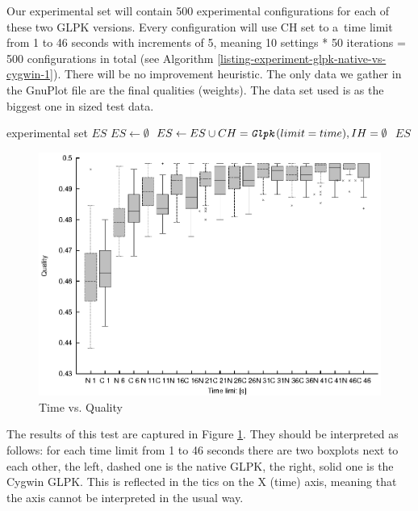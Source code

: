 Our experimental set will contain 500 experimental configurations for each of these two GLPK versions. Every configuration will use  CH set to a~time limit from 1 to 46 seconds with increments of 5, meaning 10 settings * 50 iterations = 500 configurations in total (see Algorithm \ref{listing-experiment-glpk-native-vs-cygwin-1}). There will be no improvement heuristic. The only data we gather in the GnuPlot file are the final qualities (weights). The data set used is  as the biggest one in sized test data.\\

\begin{algorithm}
\caption{GLPK: Native vs. Cygwin Set Generation 1}
\label{listing-experiment-glpk-native-vs-cygwin-1}
\begin{algorithmic}
\ENSURE experimental set $ES$
\STATE $ES \gets \emptyset$
    \STATE $ES \gets ES \cup {CH = \texttt{\textit{Glpk}}(limit = time), IH = \emptyset}$
  \ENDFOR
\ENDFOR
\RETURN $ES$
\end{algorithmic}
\end{algorithm}

\begin{figure}
  \caption{Time vs. Quality}
  \label{image-experiment-time-vs-quality}
  \centering
    \includegraphics[width=\textwidth]{images/experiments/time-vs-quality}
\end{figure}

The results of this test are captured in Figure \ref{image-experiment-time-vs-quality}. They should be interpreted as follows: for each time limit from 1 to 46 seconds there are two boxplots next to each other, the left, dashed one is the native GLPK, the right, solid one is the Cygwin GLPK. This is reflected in the tics on the X (time) axis, meaning that the axis cannot be interpreted in the usual way.

